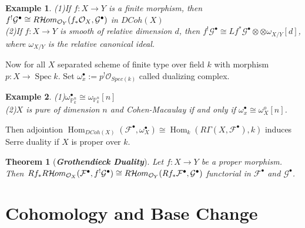 \documentclass{ctexart}
\newtheorem{theorem}{Theorem}[section]
\newtheorem{example}{Example}[section]
\renewcommand{\hom}{\operatorname{Hom}}
\newcommand{\sheafhom}{\mathcal{H}\kern -.5pt om}
\newcommand{\spec}{\operatorname{Spec}}
\begin{document}
\begin{example}
    (1)If $f: X \longrightarrow Y$ is a finite morphism, 
    then $f^{!}\mathcal{G}^{\bullet} \cong R\sheafhom_{\mathcal{O}_{Y}}(f_{\ast}\mathcal{O}_{X}, \mathcal{G}^{\bullet})$ in $DCoh(X)$ \\
    (2)If $f: X \longrightarrow Y$ is smooth of relative dimension $d$, 
    then $f^{!}\mathcal{G}^{\bullet} \cong Lf^{\ast}\mathcal{G}^{\bullet} \otimes \otimes \omega_{X/Y}[d]$, 
    where $\omega_{X/Y}$ is the relative canonical ideal.
\end{example}
Now for all $X$ separated scheme of finite type over field $k$ with morphism $p: X \longrightarrow \spec k$.
Set $\omega_{x}^{\bullet} := p^{!}\mathcal{O}_{Spec(k)}$ called dualizing complex.
\begin{example}
    (1)$\omega_{\mathbb{P}_{k}^{n}}^{\bullet} \cong \omega_{\mathbb{P}_{k}^{n}}[n]$ \\
    (2)$X$ is pure of dimension $n$ and Cohen-Macaulay if and only if $\omega_{x}^{\bullet} \cong \omega_{X}^{o}[n]$.
\end{example}
Then adjointion $\hom_{DCoh(X)}(\mathcal{F}^{\bullet}, \omega_{X}^{\bullet}) \cong \hom_{k}(R\Gamma(X, \mathcal{F}^{\bullet}), k)$ induces Serre duality if $X$ is proper over $k$.
\begin{theorem}[\textbf{\emph{Grothendieck Duality}}]
    Let $f: X \longrightarrow Y$ be a proper morphism.
    Then $Rf_{\ast}R\sheafhom_{\mathcal{O}_{X}}(\mathcal{F}^{\bullet}, f^{!}\mathcal{G}^{\bullet}) \cong R\sheafhom_{\mathcal{O}_{Y}}(Rf_{\ast}\mathcal{F}^{\bullet}, \mathcal{G}^{\bullet})$ functorial in $\mathcal{F}^{\bullet}$ and $\mathcal{G}^{\bullet}$.
    \label{Theorem 11.5}
\end{theorem}

\section{Cohomology and Base Change}
\label{section:Cohomology and Base Change}
\end{document}
